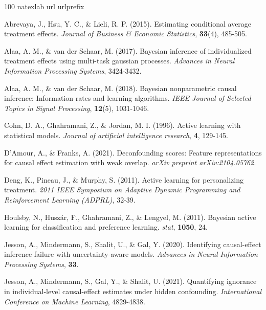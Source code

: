 \documentclass[12pt]{article}
\begin{document}
\begin{thebibliography}{100}
	\expandafter\ifx\csname natexlab\endcsname\relax\def\natexlab#1{#1}\fi
	\expandafter\ifx\csname url\endcsname\relax
	\def\url#1{\texttt{#1}}\fi
	\expandafter\ifx\csname urlprefix\endcsname\relax\def\urlprefix{URL }\fi

Abrevaya, J., Hsu, Y. C., \& Lieli, R. P. (2015). Estimating conditional average treatment effects. \textit{Journal of Business \& Economic Statistics}, \textbf{33}(4), 485-505.

Alaa, A. M., \& van der Schaar, M. (2017). Bayesian inference of individualized treatment effects using multi-task gaussian processes. \textit{Advances in Neural Information Processing Systems}, 3424-3432.

Alaa, A. M., \& van der Schaar, M. (2018). Bayesian nonparametric causal inference: Information rates and learning algorithms. \textit{IEEE Journal of Selected Topics in Signal Processing}, \textbf{12}(5), 1031-1046.

Cohn, D. A., Ghahramani, Z., \& Jordan, M. I. (1996). Active learning with statistical models. \textit{Journal of artificial intelligence research}, \textbf{4}, 129-145.

D'Amour, A., \& Franks, A. (2021). Deconfounding scores: Feature representations for causal effect estimation with weak overlap. \textit{arXiv preprint arXiv:2104.05762}.

Deng, K., Pineau, J., \& Murphy, S. (2011). Active learning for personalizing treatment. \textit{2011 IEEE Symposium on Adaptive Dynamic Programming and Reinforcement Learning (ADPRL)}, 32-39.

Houlsby, N., Husz\'{a}r, F., Ghahramani, Z., \& Lengyel, M. (2011). Bayesian active learning for classification and preference learning. \textit{stat}, \textbf{1050}, 24.

Jesson, A., Mindermann, S., Shalit, U., \& Gal, Y. (2020). Identifying causal-effect inference failure with uncertainty-aware models. \textit{Advances in Neural Information Processing Systems}, \textbf{33}.

Jesson, A., Mindermann, S., Gal, Y., \& Shalit, U. (2021). Quantifying ignorance in individual-level causal-effect estimates under hidden confounding. \textit{International Conference on Machine Learning}, 4829-4838.


\end{thebibliography}
\end{document}
